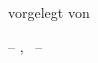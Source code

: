 \begin{titlepage}
\begin{addmargin}[-1cm]{-3cm}
\begin{center}
	{	    
        vorgelegt von\\[0.3cm]
        \Large\textcolor{Maroon}{\myName}
    }

        \vfill

        

	\vspace{3cm}
        -- \myLocation, \myTime\ --
        \vfill                      

    \end{center}  
  \end{addmargin}       
\end{titlepage}   